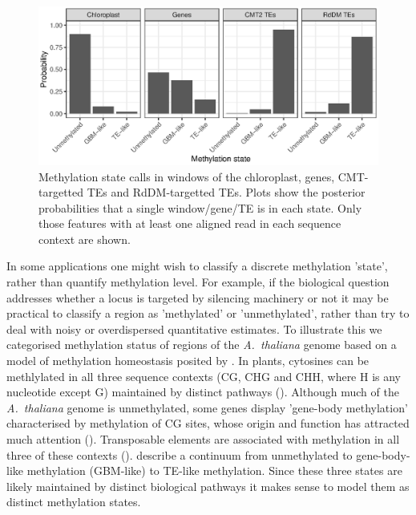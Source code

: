 \documentclass[twocolumn,twoside,lettersize]{article}
\begin{document}
\begin{figure}
    \centering
    \includegraphics{figure4.eps}
    \caption{
        Methylation state calls in windows of the chloroplast, genes, CMT-targetted TEs and RdDM-targetted TEs.
        Plots show the posterior probabilities that a single window/gene/TE is in each state.
        Only those features with at least one aligned read in each sequence context are shown.
    }
    \label{fig:meth-state}
\end{figure}

In some applications one might wish to classify a discrete methylation 'state', rather than quantify methylation level.
For example, if the biological question addresses whether a locus is targeted by silencing machinery or not it may be practical to classify a region as 'methylated' or 'unmethylated', rather than try to deal with noisy or overdispersed quantitative estimates.
To illustrate this we categorised methylation status of regions of the \emph{A.~thaliana} genome based on a model of methylation homeostasis posited by \textcite{zhang2020natural}.
In plants, cytosines can be methlylated in all three sequence contexts (CG, CHG and CHH, where H is any nucleotide except G) maintained by distinct pathways (\cite{law2010establishing}).
Although much of the \emph{A.~thaliana} genome is unmethylated, some genes display 'gene-body methylation' characterised by methylation of CG sites, whose origin and function has attracted much attention (\cite{muyle2022gene}). 
Transposable elements are associated with methylation in all three of these contexts (\cite{cokus2008shotgun, lister2008highly}).
\textcite{zhang2020natural} describe a continuum from unmethylated to gene-body-like methylation (GBM-like) to TE-like methylation.
Since these three states are likely maintained by distinct biological pathways it makes sense to model them as distinct methylation states.
\end{document}
